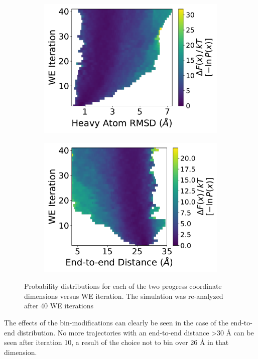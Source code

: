 \documentclass[9pt,tutorial,pubversion]{livecoms}
\begin{document}
\begin{figure}
\centering
\begin{subfigure}[A]{0.35\textwidth}
\includegraphics[width=\linewidth]{Figure7A.pdf}
\end{subfigure}
\begin{subfigure}[B]{0.35\textwidth}
\includegraphics[width=\linewidth]{Figure7B.pdf}
\end{subfigure}
\caption{Probability distributions for each of the two progress coordinate dimensions versus WE iteration. 
The simulation was re-analyzed after 40 WE iterations}
\label{fig:view}
\end{figure}

The effects of the bin-modifications can clearly be seen in the case of the end-to-end distribution. 
No more trajectories with an end-to-end distance >30 \AA{} can be seen after iteration 10, a result of the choice not to bin over 26 \AA{} in that dimension.
\end{document}
